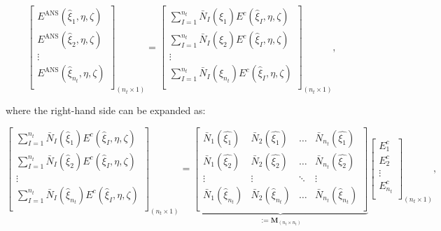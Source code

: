 \documentclass[12pt]{article}
\begin{document}
\begin{equation}
\begin{bmatrix}
E^{\text{ANS}}(\hat{\xi}_1,\eta,\zeta) \\
E^{\text{ANS}}(\hat{\xi}_2,\eta,\zeta) \\
\vdots \\
E^{\text{ANS}}(\hat{\xi}_{n_t},\eta,\zeta) \\
\end{bmatrix}_{(n_t \times 1)} =
\begin{bmatrix}
\sum_{I=1}^{n_t} \bar{N}_I (\hat{\xi}_1) E^c (\hat{\xi}_I,\eta,\zeta)\\
\sum_{I=1}^{n_t} \bar{N}_I (\hat{\xi}_2) E^c (\hat{\xi}_I,\eta,\zeta)\\
\vdots \\
\sum_{I=1}^{n_t} \bar{N}_I (\hat{\xi}_{n_t}) E^c (\hat{\xi}_I,\eta,\zeta)\\
\end{bmatrix}_{(n_t \times 1)},
\end{equation}

\noindent
where the right-hand side can be expanded as:

\begin{equation}
\begin{bmatrix}
\sum_{I=1}^{n_t} \bar{N}_I (\hat{\xi}_1) E^c (\hat{\xi}_I,\eta,\zeta)\\
\sum_{I=1}^{n_t} \bar{N}_I (\hat{\xi}_2) E^c (\hat{\xi}_I,\eta,\zeta)\\
\vdots \\
\sum_{I=1}^{n_t} \bar{N}_I (\hat{\xi}_{n_t}) E^c (\hat{\xi}_I,\eta,\zeta)\\
\end{bmatrix}_{(n_t \times 1)} =
\underbrace{
\begin{bmatrix}
\bar{N}_1 (\hat{\xi_1}) & \bar{N}_2 (\hat{\xi_1}) & \ldots & \bar{N}_{n_t} (\hat{\xi_1})\\
\bar{N}_1 (\hat{\xi_2}) & \bar{N}_2 (\hat{\xi_2}) & \ldots & \bar{N}_{n_t} (\hat{\xi_2})\\
\vdots & \vdots & \ddots & \vdots \\
\bar{N}_1 (\hat{\xi}_{n_t}) & \bar{N}_2 (\hat{\xi}_{n_t}) & \ldots & \bar{N}_{n_t} (\hat{\xi}_{n_t})\\
\end{bmatrix}}_{:= \boldsymbol{M}_{(n_t \times n_t)}}
\begin{bmatrix}
E_1^c\\
E_2^c\\
\vdots \\
E_{n_t}^c\\
\end{bmatrix}_{(n_t \times 1)},
\end{equation}
\end{document}
